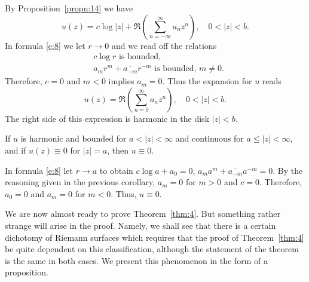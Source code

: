 \documentclass[a4paper,11pt]{article}
\begin{document}
\begin{myproof}
  By Proposition~\ref{propn:14} we have
  $$
  u(z) = c\log|z| + \Re(\sum_{n=-\infty}^{\infty} a_n z^n),\quad
  0 < |z| < b.
  $$
  In formula \eqref{e:8} we let $r \to 0$ and we read off the
  relations
  $$
  \begin{aligned}
    &c\log r \text{ is bounded},\\
    &a_m r^m + \overline{a_{-m}} r^{-m}\text{ is bounded, }m\ne 0.
  \end{aligned}
  $$
  Therefore, $c = 0$ and $m < 0$ implies $a_m = 0$.  Thus the
  expansion for $u$ reads
  $$
  u(z) = \Re(\sum_{n=0}^{\infty} a_n z^n),\quad 0 < |z| < b.
  $$
  The right side of this expression is harmonic in the disk $|z| <
  b$.
\end{myproof}

\begin{cor}
  \label{cor:p211b}
  If $u$ is harmonic and bounded for $a < |z| < \infty$ and continuous
  for $a \le |z| < \infty$, and if $u(z) \equiv 0$ for $|z| = a$, then
  $u \equiv 0$.
\end{cor}

\begin{myproof}
  In formula \eqref{e:8} let $r \to a$ to obtain $c \log a + a_0 = 0$,
  $a_m a^m + \overline{a_{-m}} a^{-m} = 0$.  By the reasoning given in
  the previous corollary, $a_m = 0$ for $m > 0$ and $c = 0$.
  Therefore, $a_0 = 0$ and $a_m = 0$ for $m < 0$.  Thus, $u \equiv
  0$.
\end{myproof}

We are now almost ready to prove Theorem~\ref{thm:4}.  But something
rather strange will arise in the proof.  Namely, we shall see that
there is a certain dichotomy of Riemann surfaces which requires that
the proof of Theorem~\ref{thm:4} be quite dependent on this
classification, although the statement of the theorem is the same in
both cases.  We present this phenomenon in the form of a proposition.
\end{document}
